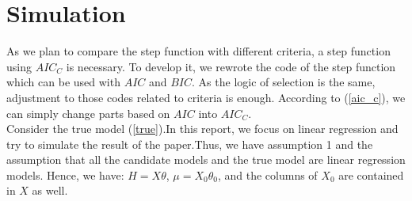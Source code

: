 \section{Simulation}

As we plan to compare the step function with different criteria, a step function using $AIC_C$ is necessary. To develop it, we rewrote the code of the step function which can be used with $AIC$ and $BIC$. As the logic of selection is the same, adjustment to those codes related to criteria is enough. According to (\ref{aic_c}), we can simply change parts based on $AIC$ into $AIC_C$.\\
Consider the true model (\ref{true}).In this report, we focus on linear regression and try to simulate the result of the paper.Thus, we have assumption 1 and the assumption that all the candidate models and the true model are linear regression models. Hence, we have:
$H = X\theta$, $\mu = X_0\theta_0$, and the columns of $X_0$ are contained in $X$ as well. \\

